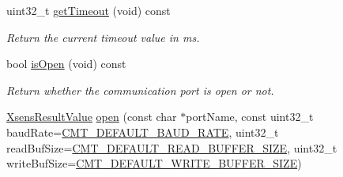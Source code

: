 \begin{DoxyCompactItemize}
\item 
\hypertarget{classxsens_1_1Cmt2s_a00b2642c545f19867d9807ee23ff3d35}{uint32\-\_\-t \hyperlink{classxsens_1_1Cmt2s_a00b2642c545f19867d9807ee23ff3d35}{get\-Timeout} (void) const }\label{classxsens_1_1Cmt2s_a00b2642c545f19867d9807ee23ff3d35}

\begin{DoxyCompactList}\small\item\em \-Return the current timeout value in ms. \end{DoxyCompactList}\item 
\hypertarget{classxsens_1_1Cmt2s_a4ba3c0dbe4bd7e55188e4695b93d70c2}{bool \hyperlink{classxsens_1_1Cmt2s_a4ba3c0dbe4bd7e55188e4695b93d70c2}{is\-Open} (void) const }\label{classxsens_1_1Cmt2s_a4ba3c0dbe4bd7e55188e4695b93d70c2}

\begin{DoxyCompactList}\small\item\em \-Return whether the communication port is open or not. \end{DoxyCompactList}\item 
\hypertarget{classxsens_1_1Cmt2s_a67c8be4806691252f9dee4136f14ac12}{\hyperlink{group__enums_ga822a2260a20af524029eef9e9a51ff6f}{\-Xsens\-Result\-Value} \hyperlink{classxsens_1_1Cmt2s_a67c8be4806691252f9dee4136f14ac12}{open} (const char $\ast$port\-Name, const uint32\-\_\-t baud\-Rate=\hyperlink{cmtdef_8h_a56b1b182fb05cb2746c0a29ab5bae7ed}{\-C\-M\-T\-\_\-\-D\-E\-F\-A\-U\-L\-T\-\_\-\-B\-A\-U\-D\-\_\-\-R\-A\-T\-E}, uint32\-\_\-t read\-Buf\-Size=\hyperlink{cmtdef_8h_a59c570baa7aed9a7ca80039ea2eddef7}{\-C\-M\-T\-\_\-\-D\-E\-F\-A\-U\-L\-T\-\_\-\-R\-E\-A\-D\-\_\-\-B\-U\-F\-F\-E\-R\-\_\-\-S\-I\-Z\-E}, uint32\-\_\-t write\-Buf\-Size=\hyperlink{cmtdef_8h_aa23bbf277ce62aa44a107c5c873d0dcd}{\-C\-M\-T\-\_\-\-D\-E\-F\-A\-U\-L\-T\-\_\-\-W\-R\-I\-T\-E\-\_\-\-B\-U\-F\-F\-E\-R\-\_\-\-S\-I\-Z\-E})}\label{classxsens_1_1Cmt2s_a67c8be4806691252f9dee4136f14ac12}


\end{DoxyCompactItemize}
